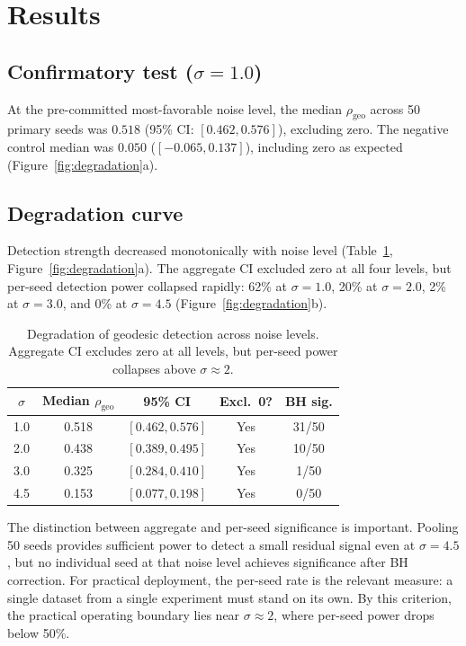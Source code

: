 \documentclass[11pt]{article}
\newcommand{\rhogeo}{\rho_\mathrm{geo}}
\begin{document}
\section{Results}
\label{sec:results}

\subsection{Confirmatory test ($\sigma = 1.0$)}

At the pre-committed most-favorable noise level, the median
$\rhogeo$ across 50 primary seeds was $0.518$ (95\% CI: $[0.462,
0.576]$), excluding zero.  The negative control median was $0.050$
($[-0.065, 0.137]$), including zero as expected
(Figure~\ref{fig:degradation}a).

\subsection{Degradation curve}

Detection strength decreased monotonically with noise level
(Table~\ref{tab:degradation}, Figure~\ref{fig:degradation}a).  The
aggregate CI excluded zero at all four levels, but per-seed
detection power collapsed rapidly: 62\% at $\sigma = 1.0$, 20\%
at $\sigma = 2.0$, 2\% at $\sigma = 3.0$, and 0\% at
$\sigma = 4.5$ (Figure~\ref{fig:degradation}b).

\begin{table}[h]
\centering
\caption{Degradation of geodesic detection across noise levels.
  Aggregate CI excludes zero at all levels, but per-seed power
  collapses above $\sigma \approx 2$.}
\label{tab:degradation}
\begin{tabular}{@{}ccccc@{}}
\toprule
$\sigma$ & Median $\rhogeo$ & 95\% CI & Excl.\ 0? & BH sig. \\
\midrule
1.0 & 0.518 & $[0.462, 0.576]$ & Yes & 31/50 \\
2.0 & 0.438 & $[0.389, 0.495]$ & Yes & 10/50 \\
3.0 & 0.325 & $[0.284, 0.410]$ & Yes & \phantom{0}1/50 \\
4.5 & 0.153 & $[0.077, 0.198]$ & Yes & \phantom{0}0/50 \\
\bottomrule
\end{tabular}
\end{table}

The distinction between aggregate and per-seed significance is
important.  Pooling 50 seeds provides sufficient power to detect a
small residual signal even at $\sigma = 4.5$, but no individual
seed at that noise level achieves significance after BH correction.
For practical deployment, the per-seed rate is the relevant measure:
a single dataset from a single experiment must stand on its own.
By this criterion, the practical operating boundary lies near
$\sigma \approx 2$, where per-seed power drops below 50\%.
\end{document}
